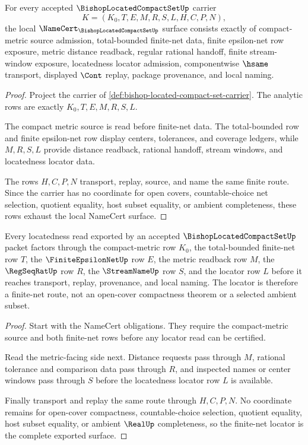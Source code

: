 \begin{theorem}
\label{thm:bishop-located-compact-set-namecert-obligations}
For every accepted $\BishopLocatedCompactSetUp$ carrier
$$
K=(K_0,T,E,M,R,S,L,H,C,P,N),
$$
the local $\NameCert_{\BishopLocatedCompactSetUp}$ surface consists exactly of compact-metric source admission, total-bounded finite-net data, finite epsilon-net row exposure, metric distance readback, regular rational handoff, finite stream-window exposure, locatedness locator admission, componentwise $\hsame$ transport, displayed $\Cont$ replay, package provenance, and local naming.
\end{theorem}
\begin{proof}
Project the carrier of \autoref{def:bishop-located-compact-set-carrier}. The analytic rows are exactly $K_0,T,E,M,R,S,L$.

The compact metric source is read before finite-net data. The total-bounded row and finite epsilon-net row display centers, tolerances, and coverage ledgers, while $M,R,S,L$ provide distance readback, rational handoff, stream windows, and locatedness locator data.

The rows $H,C,P,N$ transport, replay, source, and name the same finite route. Since the carrier has no coordinate for open covers, countable-choice net selection, quotient equality, host subset equality, or ambient completeness, these rows exhaust the local NameCert surface.
\end{proof}

\begin{theorem}
\label{thm:bishop-located-compact-set-finite-net-locator}
Every locatedness read exported by an accepted $\BishopLocatedCompactSetUp$ packet factors through the compact-metric row $K_0$, the total-bounded finite-net row $T$, the $\FiniteEpsilonNetUp$ row $E$, the metric readback row $M$, the $\RegSeqRatUp$ row $R$, the $\StreamNameUp$ row $S$, and the locator row $L$ before it reaches transport, replay, provenance, and local naming. The locator is therefore a finite-net route, not an open-cover compactness theorem or a selected ambient subset.
\end{theorem}
\begin{proof}
Start with the NameCert obligations. They require the compact-metric source and both finite-net rows before any locator read can be certified.

Read the metric-facing side next. Distance requests pass through $M$, rational tolerance and comparison data pass through $R$, and inspected names or center windows pass through $S$ before the locatedness locator row $L$ is available.

Finally transport and replay the same route through $H,C,P,N$. No coordinate remains for open-cover compactness, countable-choice selection, quotient equality, host subset equality, or ambient $\RealUp$ completeness, so the finite-net locator is the complete exported surface.
\end{proof}


